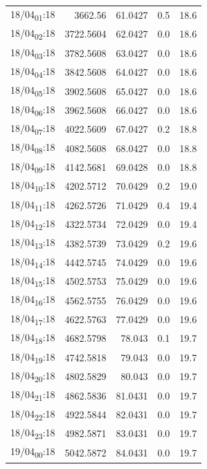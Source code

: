 \documentclass[11pt]{article}
\begin{document}
\begin{center}
\begin{tabular}{lrrrr}
18/04\textsubscript{01}:18 & 3662.56 & 61.0427 & 0.5 & 18.6\\[0pt]
18/04\textsubscript{02}:18 & 3722.5604 & 62.0427 & 0.0 & 18.6\\[0pt]
18/04\textsubscript{03}:18 & 3782.5608 & 63.0427 & 0.0 & 18.6\\[0pt]
18/04\textsubscript{04}:18 & 3842.5608 & 64.0427 & 0.0 & 18.6\\[0pt]
18/04\textsubscript{05}:18 & 3902.5608 & 65.0427 & 0.0 & 18.6\\[0pt]
18/04\textsubscript{06}:18 & 3962.5608 & 66.0427 & 0.0 & 18.6\\[0pt]
18/04\textsubscript{07}:18 & 4022.5609 & 67.0427 & 0.2 & 18.8\\[0pt]
18/04\textsubscript{08}:18 & 4082.5608 & 68.0427 & 0.0 & 18.8\\[0pt]
18/04\textsubscript{09}:18 & 4142.5681 & 69.0428 & 0.0 & 18.8\\[0pt]
18/04\textsubscript{10}:18 & 4202.5712 & 70.0429 & 0.2 & 19.0\\[0pt]
18/04\textsubscript{11}:18 & 4262.5726 & 71.0429 & 0.4 & 19.4\\[0pt]
18/04\textsubscript{12}:18 & 4322.5734 & 72.0429 & 0.0 & 19.4\\[0pt]
18/04\textsubscript{13}:18 & 4382.5739 & 73.0429 & 0.2 & 19.6\\[0pt]
18/04\textsubscript{14}:18 & 4442.5745 & 74.0429 & 0.0 & 19.6\\[0pt]
18/04\textsubscript{15}:18 & 4502.5753 & 75.0429 & 0.0 & 19.6\\[0pt]
18/04\textsubscript{16}:18 & 4562.5755 & 76.0429 & 0.0 & 19.6\\[0pt]
18/04\textsubscript{17}:18 & 4622.5763 & 77.0429 & 0.0 & 19.6\\[0pt]
18/04\textsubscript{18}:18 & 4682.5798 & 78.043 & 0.1 & 19.7\\[0pt]
18/04\textsubscript{19}:18 & 4742.5818 & 79.043 & 0.0 & 19.7\\[0pt]
18/04\textsubscript{20}:18 & 4802.5829 & 80.043 & 0.0 & 19.7\\[0pt]
18/04\textsubscript{21}:18 & 4862.5836 & 81.0431 & 0.0 & 19.7\\[0pt]
18/04\textsubscript{22}:18 & 4922.5844 & 82.0431 & 0.0 & 19.7\\[0pt]
18/04\textsubscript{23}:18 & 4982.5871 & 83.0431 & 0.0 & 19.7\\[0pt]
19/04\textsubscript{00}:18 & 5042.5872 & 84.0431 & 0.0 & 19.7\\[0pt]

\end{tabular}
\end{center}
\end{document}
